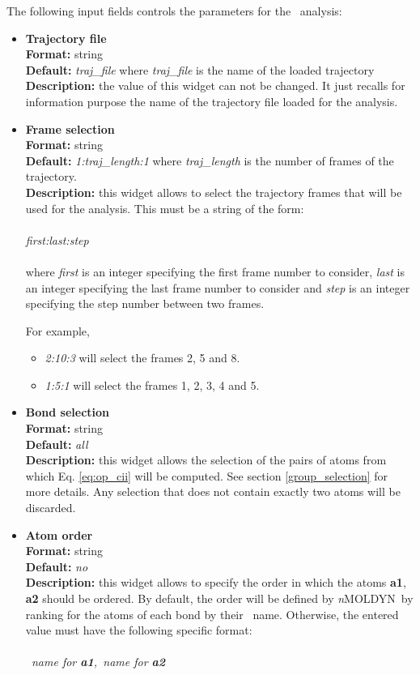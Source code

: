 \documentclass[a4paper,11pt]{report}
\newcommand{\NMOLDYN}{\textit{n}MOLDYN}
\begin{document}
The following input fields controls the parameters for the \OP\ analysis:

\begin{itemize}
\item \textbf{Trajectory file}\\
\textbf{Format:} string\\
\textbf{Default:} \textit{traj\_file} where \textit{traj\_file} is the name of the loaded trajectory\\
\textbf{Description:} the value of this widget can not be changed. It just recalls for information purpose the name
of the trajectory file loaded for the analysis.

\item \textbf{Frame selection}\\
\textbf{Format:} string\\
\textbf{Default:} \textit{1:traj\_length:1} where \textit{traj\_length} is the number of frames of the trajectory.\\
\textbf{Description:} this widget allows to select the trajectory frames that will be used for the analysis. This must
be a string of the form:
\\\\
\textit{first:last:step}
\\\\
where \textit{first} is an integer specifying the first frame number to consider, \textit{last} is an integer specifying the last 
frame number to consider and \textit{step} is an integer specifying the step number between two frames.

For example,
\begin{itemize}
\item \textit{2:10:3} will select the frames 2, 5 and 8.
\item \textit{1:5:1} will select the frames 1, 2, 3, 4 and 5.
\end{itemize}

\item \textbf{Bond selection}\\
\textbf{Format:} string\\
\textbf{Default:} \textit{all}\\
\textbf{Description:} this widget allows the selection of the pairs of atoms from which Eq. \ref{eq:op_cii} will 
be computed. See section \ref{group_selection} for more details. Any selection that does not contain exactly two atoms will be discarded.

\item \textbf{Atom order}\\
\textbf{Format:} string\\
\textbf{Default:} \textit{no}\\
\textbf{Description:} this widget allows to specify the order in which the atoms \textbf{a1}, \textbf{a2} should be 
ordered. By default, the order will be defined by \NMOLDYN\ by ranking for the atoms of each bond by their
\MMTK\ name. Otherwise, the entered value must have the following specific format:
\\\\
\textit{\MMTK\ name for \textbf{a1},\MMTK\ name for \textbf{a2}}


\end{itemize}
\end{document}
